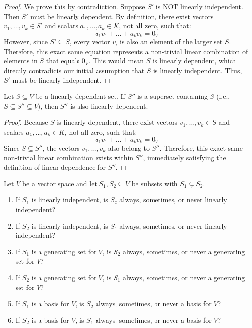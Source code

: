 \begin{proof}
We prove this by contradiction. Suppose $S'$ is NOT linearly independent. Then $S'$ must be linearly dependent. By definition, there exist vectors $v_1, \dots, v_k \in S'$ and scalars $a_1, \dots, a_k \in K$, not all zero, such that:
\[
a_1 v_1 + \dots + a_k v_k = 0_V
\]
However, since $S' \subseteq S$, every vector $v_i$ is also an element of the larger set $S$. Therefore, this exact same equation represents a non-trivial linear combination of elements in $S$ that equals $0_V$. This would mean $S$ is linearly dependent, which directly contradicts our initial assumption that $S$ is linearly independent. Thus, $S'$ must be linearly independent.
\end{proof}

\begin{lemma}
\label{lem:supersets_of_dependent_sets}
Let $S \subseteq V$ be a linearly dependent set. If $S''$ is a superset containing $S$ (i.e., $S \subseteq S'' \subseteq V$), then $S''$ is also linearly dependent.
\end{lemma}

\begin{proof}
Because $S$ is linearly dependent, there exist vectors $v_1, \dots, v_k \in S$ and scalars $a_1, \dots, a_k \in K$, not all zero, such that:
\[
a_1 v_1 + \dots + a_k v_k = 0_V
\]
Since $S \subseteq S''$, the vectors $v_1, \dots, v_k$ also belong to $S''$. Therefore, this exact same non-trivial linear combination exists within $S''$, immediately satisfying the definition of linear dependence for $S''$.
\end{proof}

\begin{exercise}
\label{exc:monotonicity_independence_spanning_mc}
Let $V$ be a vector space and let $S_1, S_2 \subseteq V$ be subsets with $S_1 \subsetneq S_2$.
\begin{enumerate}
    \item If $S_1$ is linearly independent, is $S_2$ always, sometimes, or never linearly independent?
    \item If $S_2$ is linearly independent, is $S_1$ always, sometimes, or never linearly independent?
    \item If $S_1$ is a generating set for $V$, is $S_2$ always, sometimes, or never a generating set for $V$?
    \item If $S_2$ is a generating set for $V$, is $S_1$ always, sometimes, or never a generating set for $V$?
    \item If $S_1$ is a basis for $V$, is $S_2$ always, sometimes, or never a basis for $V$?
    \item If $S_2$ is a basis for $V$, is $S_1$ always, sometimes, or never a basis for $V$?
\end{enumerate}
\end{exercise}

